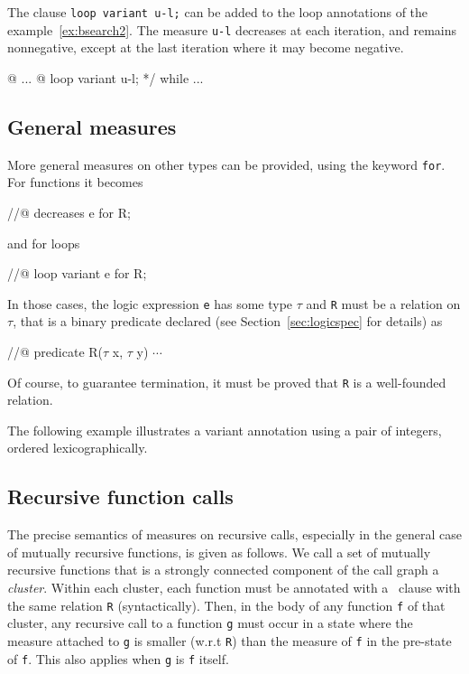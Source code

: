 \begin{example}
  The clause \lstinline|loop variant u-l;| can be added to the loop 
  annotations of the example~\ref{ex:bsearch2}.
  The measure \lstinline|u-l| decreases
  at each iteration, and remains nonnegative, except at the last
  iteration where it may become negative.
\begin{listing}{16}
  @ ...
  @ loop variant u-l; */
while ...
\end{listing}
\end{example}

\subsection{General measures}
\label{sec:generalmeasures}

More general measures on other types can be provided, using the
keyword \lstinline|for|. For functions it becomes
\begin{listing-nonumber}
//@ decreases e for R;
\end{listing-nonumber}
and for loops
\begin{listing-nonumber}
//@ loop variant e for R;
\end{listing-nonumber}
In those cases, the logic expression \lstinline|e| has some type
$\tau$ and \lstinline|R|
must be a relation on $\tau$, that is a binary predicate declared 
(see Section~\ref{sec:logicspec} for details) as
\begin{listing-nonumber}
//@ predicate R($\tau$ x, $\tau$ y) $\cdots$
\end{listing-nonumber}
Of course, to guarantee
termination, it must be proved that \lstinline|R| is a well-founded relation.

\begin{example}
  The following example illustrates a variant annotation
  using a pair of integers, ordered lexicographically.
\end{example}

\subsection{Recursive function calls}

The precise semantics of measures on recursive calls, especially in
the general case of mutually recursive functions, is given as follows.
We call a set of mutually recursive functions that
is a strongly connected component of the call graph
a \emph{cluster}.
Within each cluster, each function must be annotated with a \decreases\
clause with the same relation \lstinline|R| (syntactically). Then, in the body
of any function \lstinline|f| of that cluster, any recursive call to a function
\lstinline|g| must occur in a state where the measure attached to
\lstinline|g| is smaller
(w.r.t \lstinline|R|) than the measure of \lstinline|f| in the pre-state of \lstinline|f|. This also
applies when \lstinline|g| is \lstinline|f| itself.

